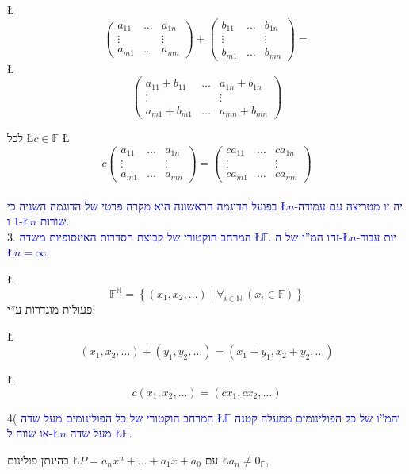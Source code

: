 \documentclass[english,hebrew]{article}
\begin{document}
\L{%
\[
\begin{pmatrix}a_{11} & \dots & a_{1n}\\
\vdots &  & \vdots\\
a_{m1} & \dots & a_{mn}
\end{pmatrix}+\begin{pmatrix}b_{11} & \dots & b_{1n}\\
\vdots &  & \vdots\\
b_{m1} & \dots & b_{mn}
\end{pmatrix}=
\]
}%
\L{%
\[
\begin{pmatrix}a_{11}+b_{11} & \dots & a_{1n}+b_{1n}\\
\vdots &  & \vdots\\
a_{m1}+b_{m1} & \dots & a_{mn}+b_{mn}
\end{pmatrix}
\]
}%

לכל \L{$c\in\mathbb{F}$} \L{%
\[
c\begin{pmatrix}a_{11} & \dots & a_{1n}\\
\vdots &  & \vdots\\
a_{m1} & \dots & a_{mn}
\end{pmatrix}=\begin{pmatrix}ca_{11} & \dots & ca_{1n}\\
\vdots &  & \vdots\\
ca_{m1} & \dots & ca_{mn}
\end{pmatrix}
\]
}%
\\

\textcolor{blue}{בפועל הדוגמה הראשונה היא מקרה פרטי של הדוגמה השניה
כי \L{$n$}-יה זו מטריצה עם עמודה 1 ו-\L{$n$} שורות.}\\

3. \textcolor{blue}{המרחב הוקטורי של קבוצת הסדרות האינסופיות משדה
\L{$\mathbb{F}$}. זהו המ\textquotedblright ו של ה-\L{$n$}-יות עבור
\L{$n=\infty$}.}

\L{%
\[
\mathbb{F}^{\mathbb{N}}=\left\{ (x_{1},x_{2},\dots)\mid\forall_{i\in\mathbb{N}}\ (x_{i}\in\mathbb{F})\right\} 
\]
}%
פעולות מוגדרות ע\textquotedblright י:

\L{%
\[
(x_{1},x_{2},\dots)+(y_{1},y_{2},\dots)=(x_{1}+y_{1},x_{2}+y_{2},\dots)
\]
}%

\L{%
\[
c(x_{1},x_{2},\dots)=(cx_{1},cx_{2},\dots)
\]
}%

4( \textcolor{blue}{המרחב הוקטורי של כל הפולינומים מעל שדה \L{$\mathbb{F}$}
והמ\textquotedblright ו של כל הפולינומים ממעלה קטנה או שווה ל-\L{$n$}
מעל שדה \L{$\mathbb{F}$}.}

בהינתן פולינום \L{$P=a_{n}x^{n}+...+a_{1}x+a_{0}$} עם \L{$a_{n}\neq0_{\mathbb{F}}$},
\end{document}
